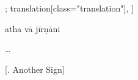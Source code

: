 \begin{alignment}[
  texts=edition[class="edition"];
  translation[class="translation"],
  ]
\begin{edition}
\begin{prose}
atha vā jīrṇāni
\begin{otherlanguage}{english}\ldots\end{otherlanguage}
\end{prose} 
  \end{edition}
  \begin{translation}
  \centerline{\textrm{\small{[.\textsuperscript{} Another Sign]}}}
    \label{anjacihnatrans}   
    \bigskip
    \begin{tlate}
      \noindent

\end{tlate}
\end{translation}
\end{alignment}

